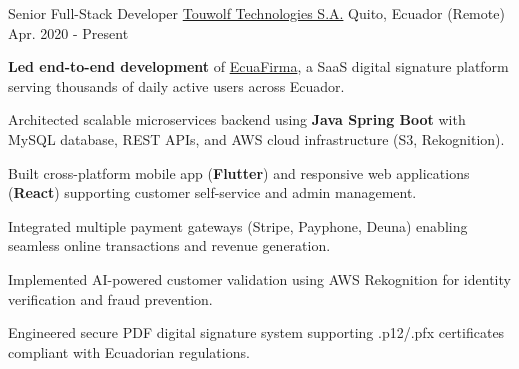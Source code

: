 
\begin{cventries}

  \cventry
    {Senior Full-Stack Developer} %
    {\href{https://touwolf.com/}{Touwolf Technologies S.A.}} %
    {Quito, Ecuador (Remote)} %
    {Apr. 2020 - Present} %
    {
      \begin{cvitems} %
        \item {\textbf{Led end-to-end development} of \href{https://ecuafirma.com}{EcuaFirma}, a SaaS digital signature platform serving thousands of daily active users across Ecuador.}
        \item {Architected scalable microservices backend using \textbf{Java Spring Boot} with MySQL database, REST APIs, and AWS cloud infrastructure (S3, Rekognition).}
        \item {Built cross-platform mobile app (\textbf{Flutter}) and responsive web applications (\textbf{React}) supporting customer self-service and admin management.}
        \item {Integrated multiple payment gateways (Stripe, Payphone, Deuna) enabling seamless online transactions and revenue generation.}
        \item {Implemented AI-powered customer validation using AWS Rekognition for identity verification and fraud prevention.}
        \item {Engineered secure PDF digital signature system supporting .p12/.pfx certificates compliant with Ecuadorian regulations.}
      \end{cvitems}
    }


\end{cventries}
